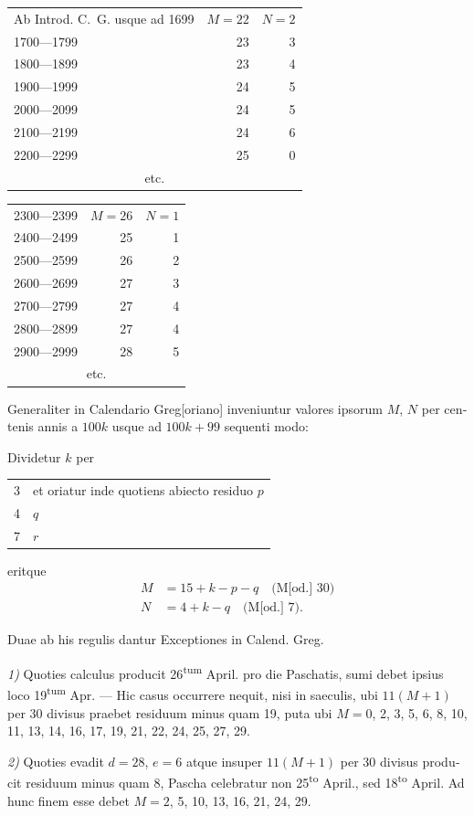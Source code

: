 \documentclass[12pt,a4paper]{article}
\theoremstyle{plain}
\theoremstyle{definition}
\theoremstyle{remark}
\begin{document}
\begin{otherlanguage}{latin}
\begin{center}
\begin{tabular}{l@{\quad}r@{\quad}r}
Ab Introd. C.~G. usque ad 1699 & $M = 22$ & $N = 2$ \\
1700---1799 & 23 & 3 \\
1800---1899 & 23 & 4 \\
1900---1999 & 24 & 5 \\
2000---2099 & 24 & 5 \\
2100---2199 & 24 & 6 \\
2200---2299 & 25 & 0 \\
\multicolumn{3}{c}{etc.}
\end{tabular}
\qquad
\begin{tabular}{l@{\quad}r@{\quad}r}
2300---2399 & $M = 26$ & $N = 1$ \\
2400---2499 & 25 & 1 \\
2500---2599 & 26 & 2 \\
2600---2699 & 27 & 3 \\
2700---2799 & 27 & 4 \\
2800---2899 & 27 & 4 \\
2900---2999 & 28 & 5 \\
\multicolumn{3}{c}{etc.}
\end{tabular}
\end{center}

Generaliter in Calendario Greg[oriano] inveniuntur valores ipsorum $M$, $N$ per centenis annis a $100k$ usque ad $100k + 99$ sequenti modo:

Dividetur $k$ per
\begin{center}
\begin{tabular}{r@{\quad}l}
3 & et oriatur inde quotiens abiecto residuo $p$ \\
4 & \dotfill\quad $q$ \\
7 & \dotfill\quad $r$
\end{tabular}
\end{center}
eritque
\begin{align*}
M &= 15 + k - p - q \quad \text{(M[od.] 30)} \\
N &= 4 + k - q \quad \text{(M[od.] 7).}
\end{align*}

Duae ab his regulis dantur Exceptiones in Calend. Greg.

\textit{1)} Quoties calculus producit 26\textsuperscript{tum} April. pro die Paschatis, sumi debet ipsius loco 19\textsuperscript{tum} Apr. --- Hic casus occurrere nequit, nisi in saeculis, ubi $11(M + 1)$ per 30 divisus praebet residuum minus quam 19, puta ubi $M = 0$, 2, 3, 5, 6, 8, 10, 11, 13, 14, 16, 17, 19, 21, 22, 24, 25, 27, 29.

\textit{2)} Quoties evadit $d = 28$, $e = 6$ atque insuper $11(M + 1)$ per 30 divisus producit residuum minus quam 8, Pascha celebratur non 25\textsuperscript{to} April., sed 18\textsuperscript{to} April. Ad hunc finem esse debet $M = 2$, 5, 10, 13, 16, 21, 24, 29.
\end{otherlanguage}
\end{document}
